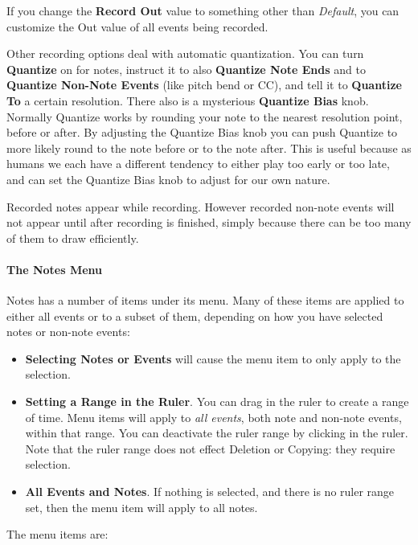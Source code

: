 \documentclass[twoside,10pt]{article}
\begin{document}
If you change the {\bf Record Out} value to something other than {\it Default}, you can customize the Out value of all events being recorded.

Other recording options deal with automatic quantization.  You can turn {\bf Quantize} on for notes, instruct it to also {\bf Quantize Note Ends} and to {\bf Quantize Non-Note Events} (like pitch bend or CC), and tell it to {\bf Quantize To} a certain resolution.  There also is a mysterious {\bf Quantize Bias} knob.  Normally Quantize works by rounding your note to the nearest resolution point, before or after.  By adjusting the Quantize Bias knob you can push Quantize to more likely round to the note before or to the note after.  This is useful because as humans we each have a different tendency to either play too early or too late, and can set the Quantize Bias knob to adjust for our own nature.

Recorded notes appear while recording.  However recorded non-note events will not appear until after recording is finished, simply because there can be too many of them to draw efficiently.

\paragraph{The Notes Menu} Notes has a number of items under its menu.  Many of these items are applied to either all events or to a subset of them, depending on how you have selected notes or non-note events: 

\begin{itemize}
\item {\bf Selecting Notes or Events} will cause the menu item to only apply to the selection.
\item {\bf Setting a Range in the Ruler}.  You can drag in the ruler to create a range of time.  Menu items will apply to {\it all events}, both note and non-note events, within that range.  You can deactivate the ruler range by clicking in the ruler.  Note that the ruler range does not effect Deletion or Copying: they require selection.
\item {\bf All Events and Notes}.  If nothing is selected, and there is no ruler range set, then the menu item will apply to all notes.
\end{itemize}

\noindent The menu items are:
\end{document}

